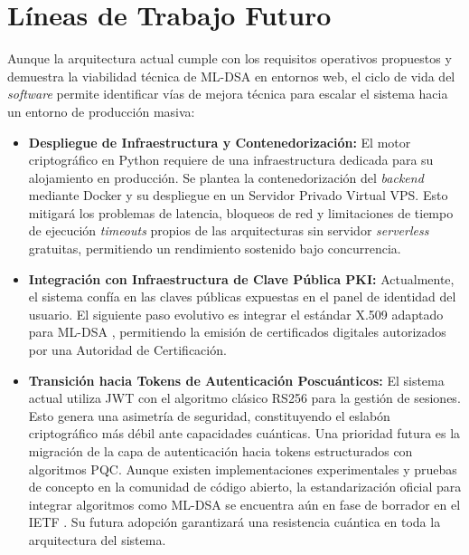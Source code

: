 \documentclass[11pt, a4paper]{report}
\theoremstyle{definition}
\begin{document}
\section{Líneas de Trabajo Futuro}
\label{sec:trabajo_futuro}

Aunque la arquitectura actual cumple con los requisitos operativos propuestos y demuestra la viabilidad técnica de ML-DSA en entornos web, el ciclo de vida del \textit{software} permite identificar vías de mejora técnica para escalar el sistema hacia un entorno de producción masiva:

\begin{itemize}
    \item \textbf{Despliegue de Infraestructura y Contenedorización:} El motor criptográfico en Python requiere de una infraestructura dedicada para su alojamiento en producción. Se plantea la contenedorización del \textit{backend} mediante Docker y su despliegue en un Servidor Privado Virtual VPS. Esto mitigará los problemas de latencia, bloqueos de red y limitaciones de tiempo de ejecución \textit{timeouts} propios de las arquitecturas sin servidor \textit{serverless} gratuitas, permitiendo un rendimiento sostenido bajo concurrencia.
    
    \item \textbf{Integración con Infraestructura de Clave Pública PKI:} Actualmente, el sistema confía en las claves públicas expuestas en el panel de identidad del usuario. El siguiente paso evolutivo es integrar el estándar X.509 adaptado para ML-DSA \cite{ietf_mldsa_pki}, permitiendo la emisión de certificados digitales autorizados por una Autoridad de Certificación.

    \item \textbf{Transición hacia Tokens de Autenticación Poscuánticos:} El sistema actual utiliza JWT con el algoritmo clásico RS256 para la gestión de sesiones. Esto genera una asimetría de seguridad, constituyendo el eslabón criptográfico más débil ante capacidades cuánticas. Una prioridad futura es la migración de la capa de autenticación hacia tokens estructurados con algoritmos PQC. Aunque existen implementaciones experimentales y pruebas de concepto en la comunidad de código abierto, la estandarización oficial para integrar algoritmos como ML-DSA  se encuentra aún en fase de borrador en el IETF \cite{ietf_pqc_jose}. Su futura adopción garantizará una resistencia cuántica en toda la arquitectura del sistema.
    
\end{itemize}
\end{document}
